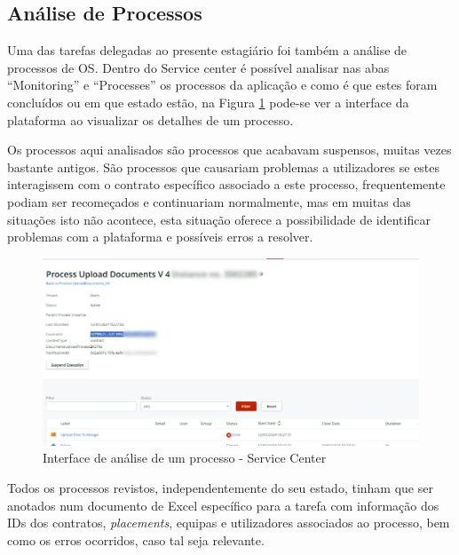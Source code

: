     \subsection{Análise de Processos}\label{sub:processos}

        Uma das tarefas delegadas ao presente estagiário foi também a análise de processos de OS. Dentro do Service center é possível analisar nas abas ``Monitoring'' e ``Processes'' os processos da aplicação e como é que estes foram concluídos ou em que estado estão, na Figura \ref{fig:interface_processo_servicecenter} pode-se ver a interface da plataforma ao visualizar os detalhes de um processo.

        Os processos aqui analisados são processos que acabavam suspensos, muitas vezes bastante antigos. São processos que causariam problemas a utilizadores se estes interagissem com o contrato específico associado a este processo, frequentemente podiam ser recomeçados e continuariam normalmente, mas em muitas das situações isto não acontece, esta situação oferece a possibilidade de identificar problemas com a plataforma e possíveis erros a resolver.

        \begin{figure}[H]
            \centering
            \includegraphics[width=\textwidth]{imgs/ProcessoServiceCenter.png}
            \caption{Interface de análise de um processo - Service Center}\label{fig:interface_processo_servicecenter}
        \end{figure}

        Todos os processos revistos, independentemente do seu estado, tinham que ser anotados num documento de Excel específico para a tarefa com informação dos IDs dos contratos, \textit{placements}, equipas e utilizadores associados ao processo, bem como os erros ocorridos, caso tal seja relevante.

